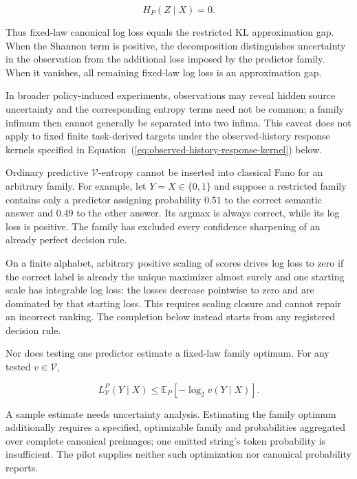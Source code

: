 \documentclass[10pt]{article} %
\renewcommand{\eqref}[1]{\textup{(\ref{#1})}}
\providecommand{\1}{\mathbf{1}}  %
\theoremstyle{remark}
\theoremstyle{definition}
\begin{document}
\begin{equation}
H_P(Z\mid X)=0.
\end{equation}

Thus fixed-law canonical log loss equals the restricted KL approximation
gap. When the Shannon term is positive, the decomposition distinguishes
uncertainty in the observation from the additional loss imposed by the
predictor family. When it vanishes, all remaining fixed-law log loss is
an approximation gap.

In broader policy-induced experiments, observations may reveal hidden
source uncertainty and the corresponding entropy terms need not be
common; a family infimum then cannot generally be separated into two
infima. This caveat does not apply to fixed finite task-derived targets
under the observed-history response kernels specified in
Equation~\eqref{eq:observed-history-response-kernel} below.

Ordinary predictive $\mathcal V$-entropy cannot be inserted into classical Fano for an arbitrary family. For example, let $Y=X\in\{0,1\}$ and suppose a restricted family contains only a predictor assigning probability $0.51$ to the correct semantic answer and $0.49$ to the other answer. Its argmax is always correct, while its log loss is positive. The family has excluded every confidence sharpening of an already perfect decision rule.

On a finite alphabet, arbitrary positive scaling of scores drives log
loss to zero if the correct label is already the unique maximizer
almost surely and one starting scale has integrable log loss: the losses
decrease pointwise to zero and are dominated by that starting loss.
This requires scaling closure and cannot repair an incorrect ranking.
The completion below instead starts from any registered decision rule.

Nor does testing one predictor estimate a fixed-law family optimum. For any tested $v\in\mathcal V$,

\begin{equation}
L_{\mathcal V}^{P}(Y\mid X)
\leq
\mathbb E_P[-\log_2v(Y\mid X)].
\label{eq:single-predictor-upper-bound}
\end{equation}

A sample estimate needs uncertainty analysis. Estimating the family
optimum additionally requires a specified, optimizable family and
probabilities aggregated over complete canonical preimages; one emitted
string's token probability is insufficient. The pilot supplies neither
such optimization nor canonical probability reports.
\end{document}
